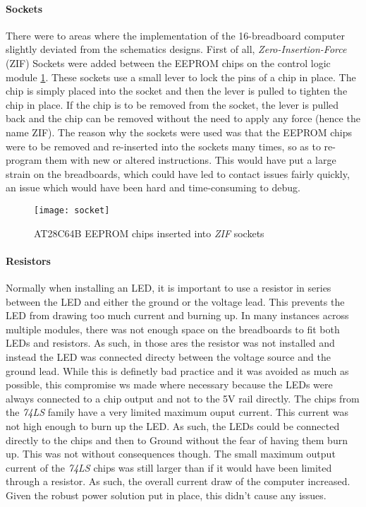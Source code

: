 \paragraph{Sockets}
There were to areas where the implementation of the 16-breadboard computer slightly deviated
from the schematics designs. First of all, \emph{Zero-Insertion-Force} (ZIF) Sockets were added
between the EEPROM chips on the control logic module \ref{socket}. These sockets use a small
lever to lock the pins of a chip in place. The chip is simply placed into the socket and then the
lever is pulled to tighten the chip in place. If the chip is to be removed from the socket, the
lever is pulled back and the chip can be removed without the need to apply any force (hence the
name ZIF). The reason why the sockets were used was that the EEPROM chips were to be removed and
re-inserted into the sockets many times, so as to re-program them with new or altered
instructions. This would have put a large strain on the breadboards, which could have led to
contact issues fairly quickly, an issue which would have been hard and time-consuming to debug.

\begin{figure}[ht]
  \centering
  \texttt{[image: socket]}
  \caption{AT28C64B \cite{at28c64b} EEPROM chips inserted into \emph{ZIF} sockets}
  \label{socket}
\end{figure}


 \paragraph{Resistors}
 Normally when installing an LED, it is important to use a resistor in series between the LED
 and either the ground or the voltage lead. This prevents the LED from drawing too much current
 and burning up. In many instances across multiple modules, there was not enough space on the
 breadboards to fit both LEDs and resistors. As such, in those ares the resistor was not
 installed and instead the LED was connected directy between the voltage source and the ground
 lead. While this is definetly bad practice and it was avoided as much as possible, this
 compromise ws made where necessary because the LEDs were always connected to a chip output and
 not to the 5V rail directly. The chips from the \emph{74LS} family have a very limited maximum
 ouput current. This current was not high enough to burn up the LED. As such, the LEDs could
 be connected directly to the chips and then to Ground without the fear of having them burn up.
 This was not without consequences though. The small maximum output current of the \emph{74LS}
 chips was still larger than if it would have been limited through a resistor. As such, the
 overall current draw of the computer increased. Given the robust power solution put in place,
 this didn't cause any issues.

